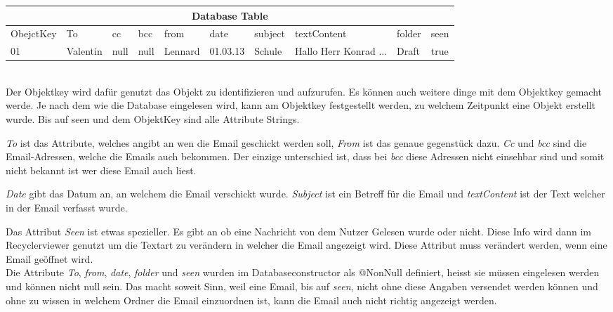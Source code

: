 \documentclass[a4paper,11pt]{article}
\begin{document}
\begin{tabular}{ |p{1.6cm}  |p{1.1cm} |p{1.1cm} |p{1.05cm} |p{1.15cm} |p{1.15cm} |p{1.25cm} |p{1.75cm} |p{1.25cm} |p{1.15cm}|}
 \hline
 \multicolumn{10}{|c|}{Database Table} \\
 \hline
    ObejctKey &To & cc & bcc & from & date & subject & textContent & folder & seen  \\
 \hline
     01    &Valentin& null & null & Lennard & 01.03.13 & Schule &  Hallo Herr Konrad ...& Draft & true \\
 \hline
\end{tabular} \\

Der Objektkey wird dafür genutzt das Objekt zu identifizieren und aufzurufen. Es können auch weitere dinge mit dem Objektkey gemacht werde. 
Je nach dem wie die Database eingelesen wird, kann am Objektkey festgestellt werden, zu welchem Zeitpunkt eine Objekt erstellt wurde. Bis auf seen und dem ObjektKey sind 
alle Attribute Strings. 

\textit{To} ist das Attribute, welches angibt an wen die Email geschickt werden soll, \textit{From} ist das genaue gegenstück dazu. \textit{Cc} und \textit{bcc} sind die 
Email-Adressen, welche die Emails auch bekommen. Der einzige unterschied ist, dass bei \textit{bcc} diese Adressen nicht einsehbar sind und somit nicht bekannt ist wer diese Email auch liest. 

\textit{Date} gibt das Datum an, an welchem die Email verschickt wurde. \textit{Subject} ist ein Betreff für die Email und \textit{textContent} ist der Text welcher in der Email verfasst wurde. 

Das Attribut \textit{Seen} ist etwas spezieller. Es gibt an ob eine Nachricht von dem Nutzer Gelesen wurde oder nicht. Diese Info wird dann im Recyclerviewer genutzt um die Textart zu verändern
in welcher die Email angezeigt wird. Diese Attribut muss verändert werden, wenn eine Email geöffnet wird. \\

Die Attribute \textit{To}, \textit{from}, \textit{date}, \textit{folder} und \textit{seen} wurden im Databaseconstructor als @NonNull definiert, heisst sie müssen eingelesen werden und können 
nicht null sein. Das macht soweit Sinn, weil eine Email, bis auf \textit{seen}, nicht ohne diese Angaben versendet werden können und ohne zu wissen in welchem Ordner die Email einzuordnen ist,
kann die Email auch nicht richtig angezeigt werden. \\
\end{document}
